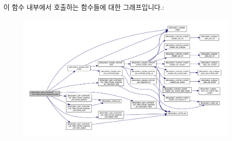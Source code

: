 이 함수 내부에서 호출하는 함수들에 대한 그래프입니다.\+:
\nopagebreak
\begin{figure}[H]
\begin{center}
\leavevmode
\includegraphics[width=350pt]{group__command__set__video__format__response_ga71bfe976b5b50c1fc0396e9fbb440ceb_cgraph}
\end{center}
\end{figure}


